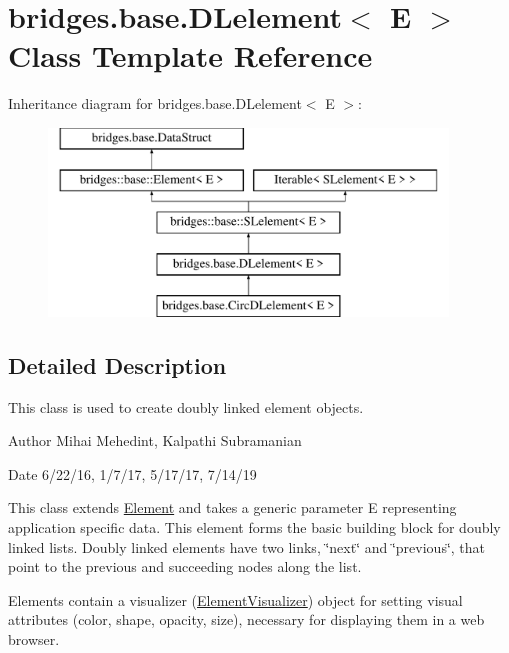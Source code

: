 \hypertarget{classbridges_1_1base_1_1_d_lelement}{}\section{bridges.\+base.\+D\+Lelement$<$ E $>$ Class Template Reference}
\label{classbridges_1_1base_1_1_d_lelement}
Inheritance diagram for bridges.\+base.\+D\+Lelement$<$ E $>$\+:\begin{figure}[H]
\begin{center}
\leavevmode
\includegraphics[height=5.000000cm]{classbridges_1_1base_1_1_d_lelement}
\end{center}
\end{figure}


\subsection{Detailed Description}
This class is used to create doubly linked element objects. 

\begin{DoxyAuthor}{Author}
Mihai Mehedint, Kalpathi Subramanian
\end{DoxyAuthor}
\begin{DoxyDate}{Date}
6/22/16, 1/7/17, 5/17/17, 7/14/19
\end{DoxyDate}
This class extends \mbox{\hyperlink{classbridges_1_1base_1_1_element}{Element}} and takes a generic parameter E representing application specific data. This element forms the basic building block for doubly linked lists. Doubly linked elements have two links, \char`\"{}next\char`\"{} and \char`\"{}previous\char`\"{}, that point to the previous and succeeding nodes along the list.

Elements contain a visualizer (\mbox{\hyperlink{classbridges_1_1base_1_1_element_visualizer}{Element\+Visualizer}}) object for setting visual attributes (color, shape, opacity, size), necessary for displaying them in a web browser.

